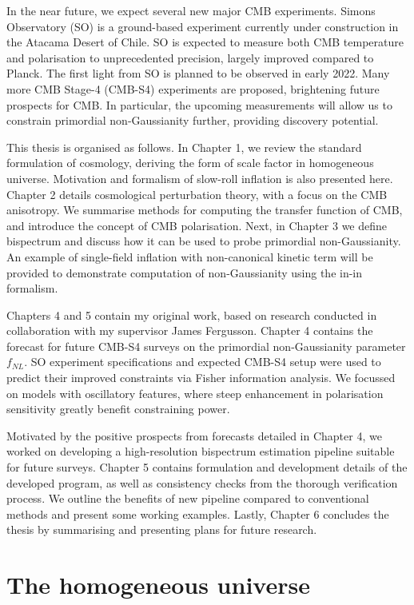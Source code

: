 In the near future, we expect several new major CMB experiments. Simons Observatory (SO) is a ground-based experiment currently under construction in the Atacama Desert of Chile. SO is expected to measure both CMB temperature and polarisation to unprecedented precision, largely improved compared to Planck. The first light from SO is planned to be observed in early 2022. Many more CMB Stage-4 (CMB-S4) experiments are proposed, brightening future prospects for CMB. In particular, the upcoming measurements will allow us to constrain primordial non-Gaussianity further, providing discovery potential.

This thesis is organised as follows. In Chapter 1, we review the standard formulation of cosmology, deriving the form of scale factor in homogeneous universe. Motivation and formalism of slow-roll inflation is also presented here. Chapter 2 details cosmological perturbation theory, with a focus on the CMB anisotropy. We summarise methods for computing the transfer function of CMB, and introduce the concept of CMB polarisation. Next, in Chapter 3 we define bispectrum and discuss how it can be used to probe primordial non-Gaussianity. An example of single-field inflation with non-canonical kinetic term will be provided to demonstrate computation of non-Gaussianity using the in-in formalism.

Chapters 4 and 5 contain my original work, based on research conducted in collaboration with my supervisor James Fergusson. Chapter 4 contains the forecast for future CMB-S4 surveys on the primordial non-Gaussianity parameter $f_{NL}$. SO experiment specifications and expected CMB-S4 setup were used to predict their improved constraints via Fisher information analysis. We focussed on models with oscillatory features, where steep enhancement in polarisation sensitivity greatly benefit constraining power.

Motivated by the positive prospects from forecasts detailed in Chapter 4, we worked on developing a high-resolution bispectrum estimation pipeline suitable for future surveys. Chapter 5 contains formulation and development details of the developed program, as well as consistency checks from the thorough verification process. We outline the benefits of new pipeline compared to conventional methods and present some working examples. Lastly, Chapter 6 concludes the thesis by summarising and presenting plans for future research.

\section{The homogeneous universe}

